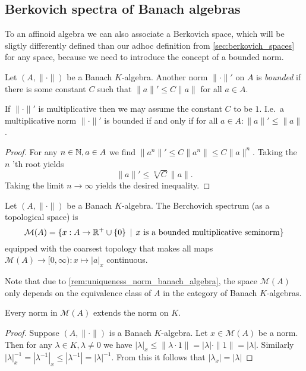 \subsection{Berkovich spectra of Banach algebras} \label{sec:berkovich_spectra_of_banach_algebras}


To an affinoid algebra we can also associate a Berkovich space, which will be sligtly differently defined than our adhoc definition from \cref{sec:berkovich_spaces} for any space, because we need to introduce the concept of a bounded norm.

\begin{definition}
	Let $(A, \|\cdot \|)$ be a Banach $K$-algebra. Another norm $\|\cdot \|'$ on $A$ is \emph{bounded}  if there is some constant $C$ such that  $\|a\|' \le C \|a\|$ for all $a \in A$. 
\end{definition}


\begin{remark}
	If $\|\cdot \|'$ is multiplicative then we may assume the constant $C$ to be $1$. 
	I.e.\ a multiplicative norm $\|\cdot \|'$ is bounded if and only if  for all $a \in A: \|a\|' \le \|a\|$. 
\end{remark}
\begin{proof}
	For any $n \in \mathbb{N}, a \in A$ we find $\|a^{n}\|' \le C \|a^{n}\| \le C \|a\|^{n}$. 
	Taking the $n$ 'th root yields \[
		\|a\|' \le \sqrt[n]{C} \|a\|
	.\] 
	Taking the limit $n \to \infty$ yields the desired inequality. 
\end{proof}

\begin{definition}\label{def:spectrum_banach_algebra}
	Let $(A, \|\cdot \|)$ be a Banach $K$-algebra. 
	The Berchovich spectrum (as a topological space) is \[
		\mathcal{M} (A) = \{x: A \to\R^{+} \cup \{0\}  \st x \text{ is a bounded multiplicative seminorm}\} 
	\] 
	equipped with the coarsest topology that makes all maps $\mathcal{M} (A) \to [0, \infty): x \mapsto |a|_x$ continuous. 
\end{definition}
Note that due to \cref{rem:uniqueness_norm_banach_algebra}, the space $\mathcal{M} (A)$ only depends on the equivalence class of $A$ in the category of Banach $K$-algebras. 

\begin{proposition}\label{prop:norm_spectrum_extends_base_field}
	Every norm in $\mathcal{M} (A)$ extends the norm on $K$. 
\end{proposition}
\begin{proof}
	Suppose $(A, \|\cdot \|)$ is a Banach $K$-algebra. 
	Let $x \in \mathcal{M} (A)$ be a norm. 
	Then for any $\lambda \in K, \lambda \ne 0$ we have $|\lambda|_x \le  \|\lambda\cdot 1\| = |\lambda| \cdot \|1\| = |\lambda|$. 
	Similarly $|\lambda|_x^{-1} = |\lambda^{-1}|_x  \le |\lambda^{-1}| = |\lambda|^{-1}$. 
	From this it follows that $|\lambda_x| = |\lambda|$
\end{proof}


